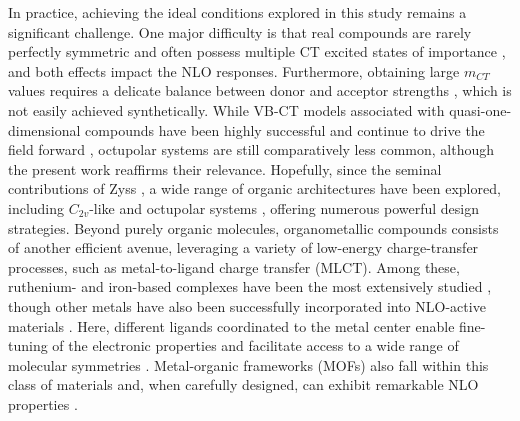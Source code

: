 \documentclass[USenglish]{article}
\begin{document}
In practice, achieving the ideal conditions explored in this study remains a significant challenge. One major difficulty is that real compounds are rarely perfectly symmetric and often possess multiple CT excited states of importance \cite{zhangTheoreticalInvestigationFirst2013}, and both effects impact the NLO responses. Furthermore, obtaining large $m_{CT}$ values requires a delicate balance between donor and acceptor strengths \cite{beaujeanUnravelingSymmetryEffects2022,postilsSecondorderNonlinearOptical2024}, which is not easily achieved synthetically.
While VB-CT models associated with quasi-one-dimensional compounds have been highly successful \cite{bourhillExperimentalDemonstrationDependence1994,daltonOrganicElectroOpticsPhotonics2015,wuHighperformanceOrganicSecond2020} and continue to drive the field forward \cite{dalton25YearsOrganic2019,dubuisNonlinearOpticalResponses2023,dellaiDynamicEffectsNonlinear2024}, octupolar systems are still comparatively less common, although the present work reaffirms their relevance. Hopefully, since the seminal contributions of Zyss \cite{zyssMolecularEngineeringImplications1993}, a wide range of organic architectures have been explored, including $C_{2v}$-like \cite{yangLargeOffDiagonalContribution2003,castetSecondorderNonlinearOptical2021,postilsSecondorderNonlinearOptical2024} and octupolar systems \cite{choElementaryDescriptionNonlinear1998,panjaSumoverstateSchemeAnalysis2010,beaujeanMultiStateSecondOrderNonlinear2022}, offering numerous powerful design strategies.
Beyond purely organic molecules, organometallic compounds consists of another efficient avenue, leveraging a variety of low-energy charge-transfer processes, such as metal-to-ligand charge transfer (MLCT). Among these, ruthenium- and iron-based complexes have been the most extensively studied \cite{coeDevelopingIronRuthenium2013,ashcroftMolecularEngineeringOrganic2019}, though other metals have also been successfully incorporated into NLO-active materials \cite{costesSynthesisCrystalStructures2005,lamereSynthesisCharacterizationNonlinear2006,lacroixSecondorderNonlinearOptics2016}. Here, different ligands coordinated to the metal center enable fine-tuning of the electronic properties and facilitate access to a wide range of molecular symmetries \cite{ashcroftMolecularEngineeringOrganic2019,beaujeanUnravelingSymmetryEffects2022,hoodSynthesisOpticalNonlinear2024}. Metal-organic frameworks (MOFs) also fall within this class of materials and, when carefully designed, can exhibit remarkable NLO properties \cite{medishettyNonlinearOpticalProperties2017,chengNonlinearOpticalProperties2021}.
\end{document}
